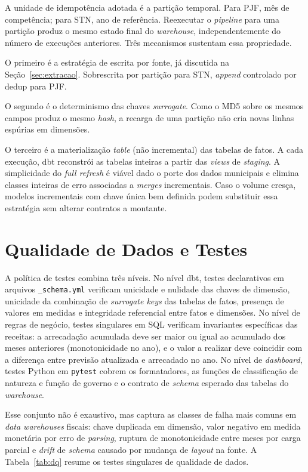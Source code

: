 A unidade de idempotência adotada é a partição temporal. Para PJF, mês de competência; para STN, ano de referência. Reexecutar o \textit{pipeline} para uma partição produz o mesmo estado final do \textit{warehouse}, independentemente do número de execuções anteriores. Três mecanismos sustentam essa propriedade.

O primeiro é a estratégia de escrita por fonte, já discutida na Seção~\ref{sec:extracao}. Sobrescrita por partição para STN, \textit{append} controlado por dedup para PJF.

O segundo é o determinismo das chaves \textit{surrogate}. Como o MD5 sobre os mesmos campos produz o mesmo \textit{hash}, a recarga de uma partição não cria novas linhas espúrias em dimensões.

O terceiro é a materialização \textit{table} (não incremental) das tabelas de fatos. A cada execução, dbt reconstrói as tabelas inteiras a partir das \textit{views} de \textit{staging}. A simplicidade do \textit{full refresh} é viável dado o porte dos dados municipais e elimina classes inteiras de erro associadas a \textit{merges} incrementais. Caso o volume cresça, modelos incrementais com chave única bem definida podem substituir essa estratégia sem alterar contratos a montante.

\section{Qualidade de Dados e Testes}

A política de testes combina três níveis. No nível dbt, testes declarativos em arquivos \texttt{\_schema.yml} verificam unicidade e nulidade das chaves de dimensão, unicidade da combinação de \textit{surrogate keys} das tabelas de fatos, presença de valores em medidas e integridade referencial entre fatos e dimensões. No nível de regras de negócio, testes singulares em SQL verificam invariantes específicas das receitas: a arrecadação acumulada deve ser maior ou igual ao acumulado dos meses anteriores (monotonicidade no ano), e o valor a realizar deve coincidir com a diferença entre previsão atualizada e arrecadado no ano. No nível de \textit{dashboard}, testes Python em \texttt{pytest} cobrem os formatadores, as funções de classificação de natureza e função de governo e o contrato de \textit{schema} esperado das tabelas do \textit{warehouse}.

Esse conjunto não é exaustivo, mas captura as classes de falha mais comuns em \textit{data warehouses} fiscais: chave duplicada em dimensão, valor negativo em medida monetária por erro de \textit{parsing}, ruptura de monotonicidade entre meses por carga parcial e \textit{drift} de \textit{schema} causado por mudança de \textit{layout} na fonte. A Tabela~\ref{tab:dq} resume os testes singulares de qualidade de dados.

